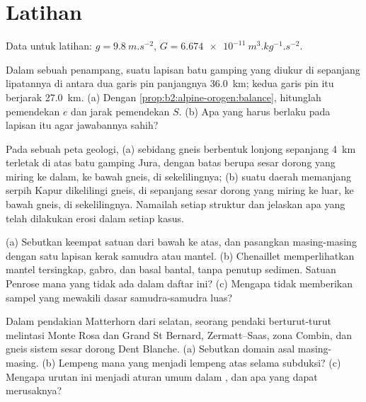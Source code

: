 \section*{Latihan}\label{sec:b2:alpine-orogen:exercises}

Data untuk latihan: $g = \qty{9.8}{m.s^{-2}}$,
$G = \qty{6.674e-11}{m^3.kg^{-1}.s^{-2}}$.

\begin{exercise}[$\star$]\label{exo:b2:alpine-orogen:1}
Dalam sebuah penampang, suatu lapisan batu gamping yang diukur di sepanjang lipatannya di antara dua garis pin
panjangnya \qty{36.0}{km}; kedua garis pin itu berjarak \qty{27.0}{km}. (a) Dengan
\cref{prop:b2:alpine-orogen:balance}, hitunglah pemendekan $e$ dan jarak pemendekan
$S$. (b) Apa yang harus berlaku pada lapisan itu agar jawabannya sahih?
\end{exercise}

\begin{exercise}[$\star$]\label{exo:b2:alpine-orogen:2}
Pada sebuah peta geologi, (a) sebidang gneis berbentuk lonjong sepanjang \qty{4}{km} terletak di atas batu gamping
Jura, dengan batas berupa sesar dorong yang miring ke dalam, ke bawah gneis, di sekelilingnya; (b) suatu
daerah memanjang serpih Kapur dikelilingi gneis, di sepanjang sesar dorong yang miring
ke luar, ke bawah gneis, di sekelilingnya. Namailah setiap struktur dan jelaskan apa yang telah dilakukan erosi
dalam setiap kasus.
\end{exercise}

\begin{exercise}[$\star$]\label{exo:b2:alpine-orogen:3}
(a) Sebutkan keempat satuan  dari bawah ke atas, dan pasangkan masing-masing
dengan satu lapisan kerak samudra atau mantel. (b)  Chenaillet memperlihatkan mantel
tersingkap, gabro, dan basal bantal, tanpa penutup sedimen. Satuan Penrose mana yang tidak ada dalam
daftar ini? (c) Mengapa  tidak memberikan sampel yang mewakili dasar samudra-samudra
luas?
\end{exercise}

\begin{exercise}[$\star$]\label{exo:b2:alpine-orogen:4}
Dalam pendakian Matterhorn dari selatan, seorang pendaki berturut-turut melintasi  Monte Rosa dan
Grand St Bernard,  Zermatt--Saas, zona Combin, dan gneis
sistem sesar dorong Dent Blanche. (a) Sebutkan domain asal masing-masing. (b) Lempeng mana yang menjadi
lempeng atas selama subduksi? (c) Mengapa urutan ini menjadi aturan umum dalam ,
dan apa yang dapat merusaknya?
\end{exercise}

